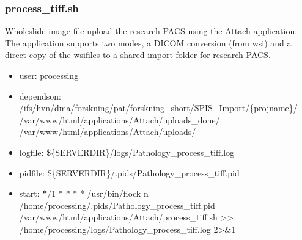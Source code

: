 \documentclass[letterpaper,10pt,english]{sphinxmanual}
\begin{document}
\subsubsection{process\_tiff.sh}
\label{\detokenize{Architecture/scripts/process_tiff:process-tiff-sh}}\label{\detokenize{Architecture/scripts/process_tiff::doc}}
\sphinxAtStartPar
Whole\sphinxhyphen{}slide image file upload the research PACS using the Attach application. The application supports two modes, a DICOM conversion (from wsi) and a direct copy of the wsi\sphinxhyphen{}files to a shared import folder for research PACS.
\begin{itemize}
\item {} 
\sphinxAtStartPar
user: processing

\item {} 
\sphinxAtStartPar
depends\sphinxhyphen{}on:
\sphinxhyphen{} /ifs/hvn/dma/forskning/pat/forskning\_short/SPIS\_Import/\{projname\}/
\sphinxhyphen{} /var/www/html/applications/Attach/uploads\_done/
\sphinxhyphen{} /var/www/html/applications/Attach/uploads/

\item {} 
\sphinxAtStartPar
log\sphinxhyphen{}file:
\sphinxhyphen{} \$\{SERVERDIR\}/logs/Pathology\_process\_tiff.log

\item {} 
\sphinxAtStartPar
pid\sphinxhyphen{}file: \$\{SERVERDIR\}/.pids/Pathology\_process\_tiff.pid

\item {} 
\sphinxAtStartPar
start:
{\color{red}\bfseries{}*}/1 * * * * /usr/bin/flock \sphinxhyphen{}n /home/processing/.pids/Pathology\_process\_tiff.pid /var/www/html/applications/Attach/process\_tiff.sh \textgreater{}\textgreater{} /home/processing/logs/Pathology\_process\_tiff.log 2\textgreater{}\&1

\end{itemize}

\sphinxstepscope
\end{document}
